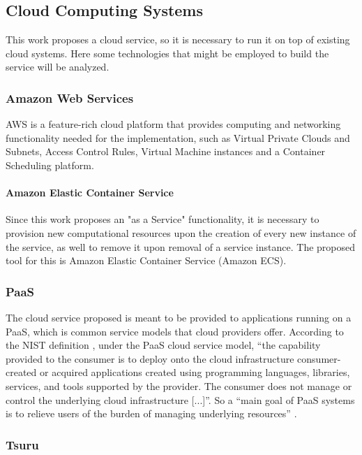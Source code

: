 \subsection{Cloud Computing Systems}

This work proposes a cloud service, so it is necessary to run it on top of existing cloud systems. Here some technologies that might be employed to build the service will be analyzed.

\subsubsection{Amazon Web Services}

AWS is a feature-rich cloud platform that provides computing and networking functionality needed for the implementation, such as Virtual Private Clouds and Subnets, Access Control Rules, Virtual Machine instances and a Container Scheduling platform.

\paragraph{Amazon Elastic Container Service}

Since this work proposes an "as a Service" functionality, it is necessary to provision new computational resources upon the creation of every new instance of the service, as well to remove it upon removal of a service instance. The proposed tool for this is Amazon Elastic Container Service (Amazon ECS).

\subsubsection{PaaS}

The cloud service proposed is meant to be provided to applications running on a PaaS, which is common service models that cloud providers offer. According to the NIST definition \cite{mell2011nist}, under the PaaS cloud service model, ``the capability provided to the consumer is to deploy onto the cloud infrastructure consumer-created or acquired applications created using programming languages, libraries, services, and tools supported by the provider. The consumer does not manage or control the underlying cloud infrastructure [...]''. So a ``main goal of PaaS systems is to relieve users of the burden of managing underlying resources'' \cite{costache2017resource}.

\subsubsection{Tsuru}

